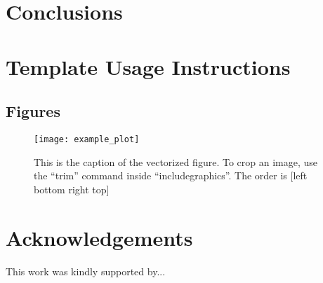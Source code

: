\documentclass[conference]{IEEEtran}
\begin{document}
\section{Conclusions}
\label{sec_conclusions}

\section{Template Usage Instructions}
\subsection{Figures} \label{sec_figures}


\begin{figure}[t] %
     \centering
     \texttt{[image: example\_plot]}
     \caption{This is the caption of the vectorized figure. To crop an image, use the ``trim'' command inside ``includegraphics''. The order is [left bottom right top]}
     \label{fig_MyLabel}
  \end{figure}


\section*{Acknowledgements}
This work was kindly supported by... 





\end{document}
